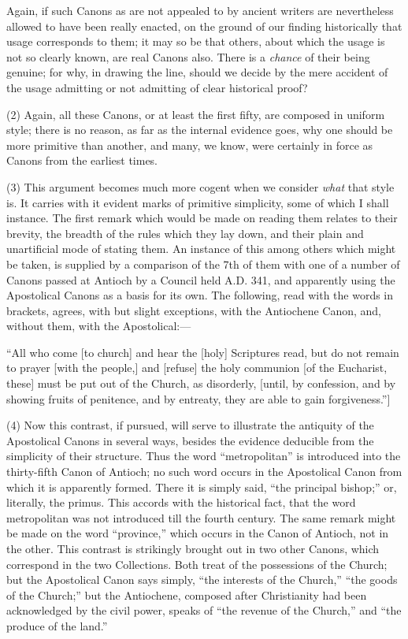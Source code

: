 Again, if such Canons as are not appealed to by ancient writers are
nevertheless allowed to have been really enacted, on the ground of our
finding historically that usage corresponds to them; it may so be that
others, about which the usage is not so clearly known, are real Canons
also. There is a \emph{chance} of their being genuine; for why, in
drawing the line, should we decide by the mere accident of the usage
admitting or not admitting of clear historical proof?

(2) Again, all these Canons, or at least the first fifty, are
composed in uniform style; there is no reason, as far as the internal
evidence goes, why one should be more primitive than another, and
many, we know, were certainly in force as Canons from the earliest
times.

(3) This argument becomes much more cogent when we consider \emph{what}
that style is. It carries with it evident marks of primitive
simplicity, some of which I shall instance. The first remark which
would be made on reading them relates to their brevity, the breadth of
the rules which they lay down, and their plain and unartificial mode
of stating them. An instance of this among others which might be
taken, is supplied by a comparison of the 7th of them with one of a
number of Canons passed at Antioch by a Council held A.D.
341, and apparently using the Apostolical Canons as a basis for its
own. The following, read with the words in brackets, agrees, with but
slight exceptions, with the Antiochene Canon, and, without them, with
the Apostolical:—

``All who come [to church] and hear the [holy] Scriptures read,
but do not remain to prayer [with the people,] and [refuse] the holy
communion [of the Eucharist, these] must be put out of the Church, as
disorderly, [until, by confession, and by showing fruits of penitence,
and by entreaty, they are able to gain forgiveness.'']

(4) Now this contrast, if pursued, will serve to illustrate the
antiquity of the Apostolical Canons in several ways, besides the
evidence deducible from the simplicity of their structure. Thus the
word ``metropolitan'' is introduced into the thirty-fifth
Canon of Antioch; no such word occurs in the Apostolical Canon from
which it is apparently formed. There it is simply said, ``the
principal bishop;'' or, literally, the primus. This accords with
the historical fact, that the word metropolitan was not introduced
till the fourth century. The same remark might be made on the word
``province,'' which occurs in the Canon of Antioch, not in the
other. This contrast is strikingly brought out in two other Canons,
which correspond in the two Collections. Both treat of the possessions
of the Church; but the Apostolical Canon says simply, ``the
interests of the Church,'' ``the goods of the Church;''
but the Antiochene, composed after Christianity had been acknowledged
by the civil power, speaks of ``the revenue of the Church,''
and ``the produce of the land.''

